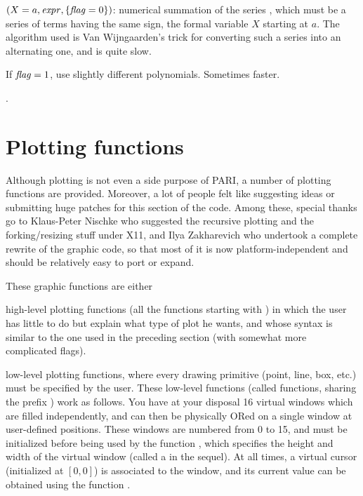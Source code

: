 $(X=a,\hbox{\it expr\/},\{\hbox{\it f\kern0pt lag\/}=0\})$: numerical summation of the
series , which must be a series of terms having the same sign,
the formal
variable $X$ starting at $a$. The algorithm used is Van Wijngaarden's trick
for converting such a series into an alternating one, and is quite slow.

If $\hbox{\it f\kern0pt lag\/}=1$, use slightly different polynomials. Sometimes faster.

.

\section{Plotting functions}

  Although plotting is not even a side purpose of PARI, a number of plotting
functions are provided. Moreover, a lot of people felt like suggesting
ideas or submitting huge patches for this section of the code. Among these,
special thanks go to Klaus-Peter Nischke who suggested the recursive plotting
and the forking/resizing stuff under X11, and Ilya Zakharevich who
undertook a complete rewrite of the graphic code, so that most of it is now
platform-independent and should be relatively easy to port or expand.

These graphic functions are either

\item high-level plotting functions (all the functions starting with
) in which the user has little to do but explain what type of plot
he wants, and whose syntax is similar to the one used in the preceding
section (with somewhat more complicated flags).

\item low-level plotting functions, where every drawing primitive (point,
line, box, etc.) must be specified by the user. These low-level functions
(called  functions, sharing the prefix ) work as
follows. You have at your disposal 16 virtual windows which are filled
independently, and can then be physically ORed on a single window at
user-defined positions. These windows are numbered from 0 to 15, and must be
initialized before being used by the function , which specifies
the height and width of the virtual window (called a  in the
sequel). At all times, a virtual cursor (initialized at $[0,0]$) is
associated to the window, and its current value can be obtained using the
function .

